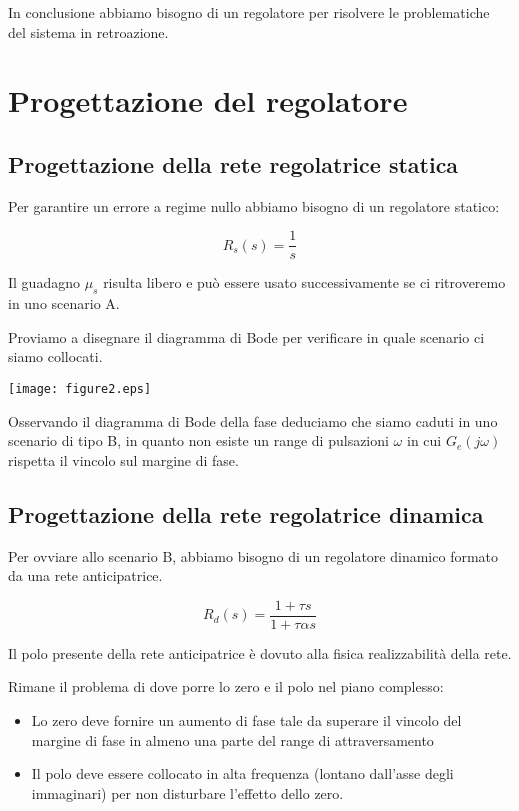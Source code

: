 \documentclass{article}
\begin{document}
In conclusione abbiamo bisogno di un regolatore per risolvere le problematiche del sistema in retroazione.

\section{Progettazione del regolatore}

\subsection{Progettazione della rete regolatrice statica}

Per garantire un errore a regime nullo abbiamo bisogno di un regolatore statico:

$$
R_s(s)=\frac{1}{s}
$$

Il guadagno $\mu_s$ risulta libero e può essere usato successivamente se ci ritroveremo in uno scenario A.

Proviamo a disegnare il diagramma di Bode per verificare in quale scenario ci siamo collocati.

\begin{center}
    \texttt{[image: figure2.eps]}
\end{center}

Osservando il diagramma di Bode della fase deduciamo che siamo caduti in uno scenario di tipo B, in quanto non esiste un range di pulsazioni $\omega$ in cui $G_e(j\omega)$ rispetta il vincolo sul margine di fase.

\subsection{Progettazione della rete regolatrice dinamica}

Per ovviare allo scenario B, abbiamo bisogno di un regolatore dinamico formato da una rete anticipatrice.

$$
R_d(s)=\frac{1+\tau s}{1+\tau \alpha s}
$$

Il polo presente della rete anticipatrice è dovuto alla fisica realizzabilità della rete.

Rimane il problema di dove porre lo zero e il polo nel piano complesso:
\begin{itemize}
    \item Lo zero deve fornire un aumento di fase tale da superare il vincolo del margine di fase in almeno una parte del range di attraversamento
    \item Il polo deve essere collocato in alta frequenza (lontano dall'asse degli immaginari) per non disturbare l'effetto dello zero.
\end{itemize}
\end{document}
